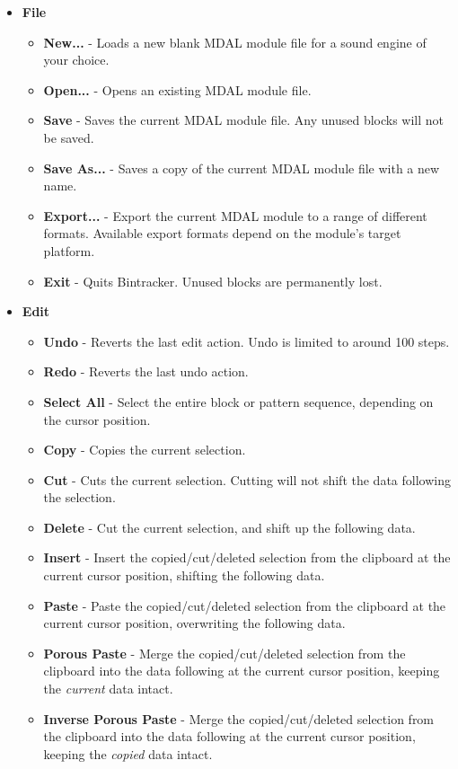 \documentclass[12pt]{report}	%
\begin{document}
\begin{itemize}
\item \textbf{File}
\begin{itemize}
\item \textbf{New...} - Loads a new blank MDAL module file for a sound engine of your choice.
\item \textbf{Open...} - Opens an existing MDAL module file.
\item \textbf{Save} - Saves the current MDAL module file. Any unused blocks will not be saved.
\item \textbf{Save As...} - Saves a copy of the current MDAL module file with a new name.
\item \textbf{Export...} - Export the current MDAL module to a range of different formats. Available export formats depend on the module's target platform.
\item \textbf{Exit} - Quits Bintracker. Unused blocks are permanently lost.
\end{itemize}
\item \textbf{Edit}
\begin{itemize}
\item \textbf{Undo} - Reverts the last edit action. Undo is limited to around 100 steps.
\item \textbf{Redo} - Reverts the last undo action.
\item \textbf{Select All} - Select the entire block or pattern sequence, depending on the cursor position.
\item \textbf{Copy} - Copies the current selection.
\item \textbf{Cut} - Cuts the current selection. Cutting will not shift the data following the selection.
\item \textbf{Delete} - Cut the current selection, and shift up the following data.
\item \textbf{Insert} - Insert the copied/cut/deleted selection from the clipboard at the current cursor position, shifting the following data.
\item \textbf{Paste} - Paste the copied/cut/deleted selection from the clipboard at the current cursor position, overwriting the following data.
\item \textbf{Porous Paste} - Merge the copied/cut/deleted selection from the clipboard into the data following at the current cursor position, keeping the \textit{current} data intact.
\item \textbf{Inverse Porous Paste} - Merge the copied/cut/deleted selection from the clipboard into the data following at the current cursor position, keeping the \textit{copied} data intact.

\end{itemize}
\end{itemize}
\end{document}
